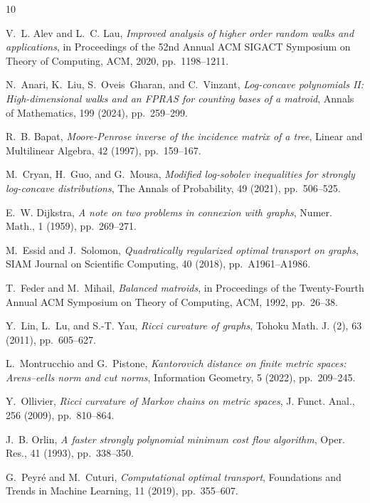 \documentclass[11pt,a4paper]{article}
\begin{document}
\begin{thebibliography}{10}

{\sc V.~L. Alev and L.~C. Lau}, {\em Improved analysis of higher order random walks and applications}, in Proceedings of the 52nd Annual ACM SIGACT Symposium on Theory of Computing, ACM, 2020, pp.~1198--1211.

{\sc N.~Anari, K.~Liu, S.~Oveis~Gharan, and C.~Vinzant}, {\em Log-concave polynomials {II}: High-dimensional walks and an {FPRAS} for counting bases of a matroid}, Annals of Mathematics, 199 (2024), pp.~259--299.

{\sc R.~B. Bapat}, {\em Moore-{P}enrose inverse of the incidence matrix of a tree}, Linear and Multilinear Algebra, 42 (1997), pp.~159--167.

{\sc M.~Cryan, H.~Guo, and G.~Mousa}, {\em Modified log-sobolev inequalities for strongly log-concave distributions}, The Annals of Probability, 49 (2021), pp.~506--525.

{\sc E.~W. Dijkstra}, {\em A note on two problems in connexion with graphs}, Numer. Math., 1 (1959), pp.~269--271.

{\sc M.~Essid and J.~Solomon}, {\em Quadratically regularized optimal transport on graphs}, SIAM Journal on Scientific Computing, 40 (2018), pp.~A1961--A1986.

{\sc T.~Feder and M.~Mihail}, {\em Balanced matroids}, in Proceedings of the Twenty-Fourth Annual ACM Symposium on Theory of Computing, ACM, 1992, pp.~26--38.

{\sc Y.~Lin, L.~Lu, and S.-T. Yau}, {\em Ricci curvature of graphs}, Tohoku Math. J. (2), 63 (2011), pp.~605--627.

{\sc L.~Montrucchio and G.~Pistone}, {\em Kantorovich distance on finite metric spaces: Arens--eells norm and cut norms}, Information Geometry, 5 (2022), pp.~209--245.

{\sc Y.~Ollivier}, {\em Ricci curvature of {M}arkov chains on metric spaces}, J. Funct. Anal., 256 (2009), pp.~810--864.

{\sc J.~B. Orlin}, {\em A faster strongly polynomial minimum cost flow algorithm}, Oper. Res., 41 (1993), pp.~338--350.

{\sc G.~Peyr{\'e} and M.~Cuturi}, {\em Computational optimal transport}, Foundations and Trends in Machine Learning, 11 (2019), pp.~355--607.


\end{thebibliography}
\end{document}
